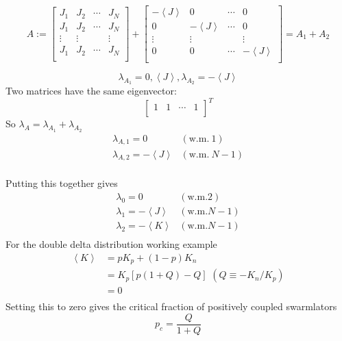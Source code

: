 \documentclass[10pt,aspectratio=43,mathserif,table]{beamer}
\begin{document}
\begin{frame}
    $$
    A:=\left[ \begin{matrix}
        J_1&		J_2&		\cdots&		J_N\\
        J_1&		J_2&		\cdots&		J_N\\
        \vdots&		\vdots&		\,\,&		\vdots\\
        J_1&		J_2&		\cdots&		J_N\\
    \end{matrix} \right] +\left[ \begin{matrix}
        -\left< J \right>&		0&		\cdots&		0\\
        0&		-\left< J \right>&		\cdots&		0\\
        \vdots&		\vdots&		\,\,&		\vdots\\
        0&		0&		\cdots&		-\left< J \right>\\
    \end{matrix} \right] = A_1 + A_2
    $$
    
    $$
    \lambda _{A_1}=0,\left< J \right> , \lambda _{A_2}=-\left< J \right> 
    $$
    Two matrices have the same eigenvector:
    $$
    \left[ \begin{matrix}
        1&		1&		\cdots&		1\\
    \end{matrix} \right] ^T
    $$    
    So $\lambda_A = \lambda _{A_1} + \lambda _{A_2}$
    $$
    \begin{matrix}
        \lambda _{A,1}=0&		\left( \mathrm{w}.\mathrm{m}.\  1 \right)\\
        \lambda _{A,2}=-\left< J \right>&		\left( \mathrm{w}.\mathrm{m}.\  N-1 \right)\\
    \end{matrix}
    $$

\end{frame}

\begin{frame}
    Putting this together gives
    $$
    \begin{matrix}
        \lambda _0=0&		\left( \mathrm{w}.\mathrm{m}. 2 \right)\\
        \lambda _1=-\left< J \right>&		\left( \mathrm{w}.\mathrm{m}. N-1 \right)\\
        \lambda _2=-\left< K \right>&		\left( \mathrm{w}.\mathrm{m}. N-1 \right)\\
    \end{matrix}
    $$
    For the double delta distribution working example
    $$
    \begin{aligned}
        \left< K \right> &=pK_p+\left( 1-p \right) K_n\\
        &=K_p\left[ p\left( 1+Q \right) -Q \right] \,\, \left( Q\equiv -K_n/K_p \right)\\
        &=0\\
    \end{aligned}
    $$
    Setting this to zero gives the critical fraction of positively coupled swarmlators
    $$
    p_c=\frac{Q}{1+Q}
    $$


\end{frame}
\end{document}
